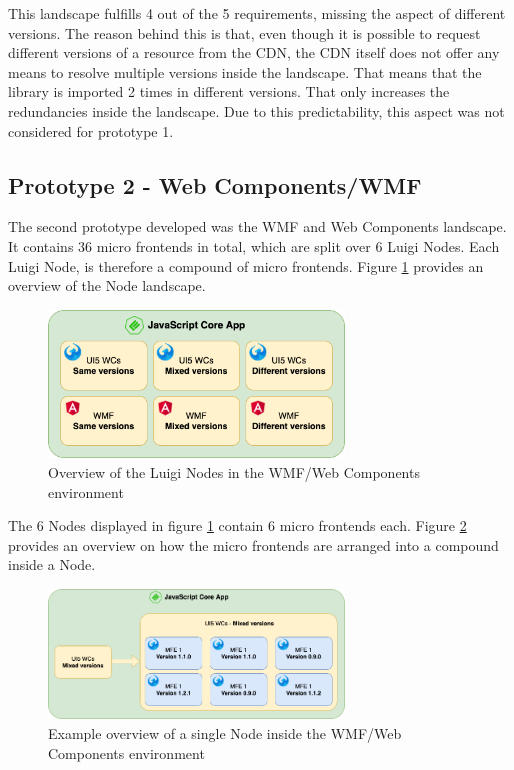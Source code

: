 This landscape fulfills 4 out of the 5 requirements, missing the aspect of different versions. The reason behind this is that, even though it is possible to request different versions of a resource from the CDN, the CDN itself does not offer any means to resolve multiple versions inside the landscape. That means that the library is imported 2 times in different versions. That only increases the redundancies inside the landscape. Due to this predictability, this aspect was not considered for prototype 1.

\subsection{Prototype 2 - Web Components/WMF}

The second prototype developed was the WMF and Web Components landscape. It contains 36 micro frontends in total, which are split over 6 Luigi Nodes.
Each Luigi Node, is therefore a compound of micro frontends.
Figure \ref{fig:compound_prototype_architecture} provides an overview of the Node landscape.

\begin{figure}[!h]
	\centering
	\includegraphics[width=0.7\textwidth]{Figures/compound_views_overview.drawio.png}
	\caption{Overview of the Luigi Nodes in the WMF/Web Components environment}
	\label{fig:compound_prototype_architecture}
\end{figure}

The 6 Nodes displayed in figure \ref{fig:compound_prototype_architecture} contain 6 micro frontends each. 
Figure \ref{fig:compound_wmf_single_node} provides an overview on how the micro frontends are arranged into a compound inside a Node.

\begin{figure}[!h]
	\centering
	\includegraphics[width=0.7\textwidth]{Figures/compound_wmf_single_node.drawio.png}
	\caption{Example overview of a single Node inside the WMF/Web Components environment}
	\label{fig:compound_wmf_single_node}
\end{figure}

